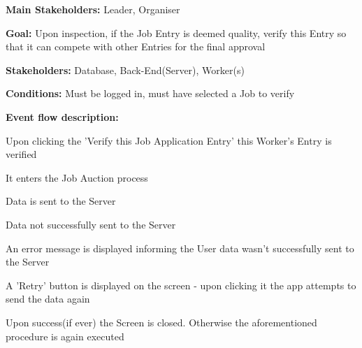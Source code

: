 			\noindent {}
			\begin{packed_item}
				\item \textbf{Main Stakeholders:} Leader, Organiser
				\item \textbf{Goal:} Upon inspection, if the Job Entry is deemed quality, verify this Entry so that it can compete with other Entries for the final approval
				\item \textbf{Stakeholders: } Database, Back-End(Server), Worker(s)
				\item \textbf{Conditions: } Must be logged in, must have selected a Job to verify
				\item \textbf{Event flow description: }
				\begin{packed_enum}
					\item Upon clicking the 'Verify this Job Application Entry' this Worker's Entry is verified
					\item It enters the Job Auction process
					\item Data is sent to the Server
				\end{packed_enum}
				
				\begin{packed_item}
					\item[3.a] Data not successfully sent to the Server
					\item[] \begin{packed_enum}
						\item An error message is displayed informing the User data wasn't successfully sent to the Server
						\item A 'Retry' button is displayed on the screen - upon clicking it the app attempts to send the data again
						\item Upon success(if ever) the Screen is closed. Otherwise the aforementioned procedure is again executed
					\end{packed_enum}
				\end{packed_item}
			\end{packed_item}


